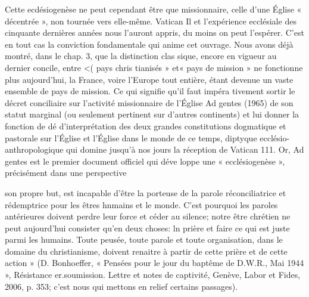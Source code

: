 


Cette ecdésiogenèse ne peut cependant être que missionnaire, celle d'une Église « décentrée », non tournée vers elle-même. Vatican Il et l'expérience ecclésiale des cinquante dernières années nous l'auront appris, du moins on peut l'espérer. C'est en tout cas la conviction fondamentale qui anime cet ouvrage. Nous avons déjà montré, dans le chap. 3, que la distinction clas­ sique, encore en vigueur au dernier concile, entre <( pays chris­ tianisés » et« pays de mission » ne fonctionne plus aujourd'hui, la France, voire l'Europe tout entière, étant devenue un vaste ensemble de pays de mission. Ce qui signifie qu'il faut impéra­ tivement sortir le décret conciliaire sur l'activité missionnaire de l'Église Ad gentes (1965) de son statut marginal (ou seulement pertinent sur d'autres continents) et lui donner la fonction de dé d'interprétation des deux grandes constitutions dogmatique et pastorale sur l'Église et l'Église dans le monde de ce temps, diptyque ecclésio-anthropologique qui domine jusqu'à nos jours la réception de Vatican 111.
Or, Ad gentes est le premier document officiel qui déve­ loppe une « ecclésiogenèse », précisément dans une perspective

son propre but, est incapable d'être la porteuse de la parole réconciliatrice et rédemptrice pour les êtres hnmains et le monde. C'est pourquoi les paroles antérieures doivent perdre leur force et céder au silence; notre être chrétien ne peut aujourd'hui consister qu'en deux choses: ln prière et faire ce qui est juste parmi les humains. Toute peusée, toute parole et toute organisation, dans le domaine du christianisme, doivent renaitre à partir de cette prière et de
cette action » (D. Bonhoeffer, « Pensées pour le jour du baptême de D.W.R., Mai 1944 », Résistance er.soumission. Lettre et notes de captivité, Genève, Labor et Fides, 2006, p. 353; c'est nous qui mettons en relief certains passages).

